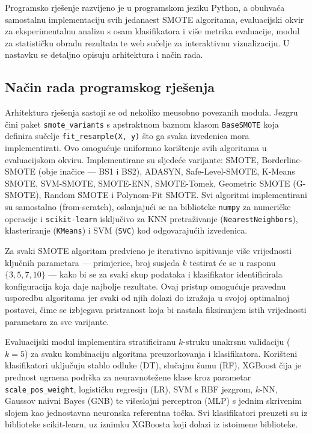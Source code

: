 
Programsko rje\v{s}enje razvijeno je u programskom jeziku Python, a
obuhva\'{c}a samostalnu implementaciju svih jedanaest SMOTE algoritama,
evaluacijski okvir za eksperimentalnu analizu s osam klasifikatora i
vi\v{s}e metrika evaluacije, modul za statisti\v{c}ku obradu rezultata
te web su\v{c}elje za interaktivnu vizualizaciju. U nastavku se
detaljno opisuju arhitektura i na\v{c}in rada.

\subsection{Na\v{c}in rada programskog rje\v{s}enja}

Arhitektura rje\v{s}enja sastoji se od nekoliko me\dj{}usobno povezanih
modula. Jezgru \v{c}ini paket \texttt{smote\_variants} s apstraktnom
baznom klasom \texttt{BaseSMOTE} koja definira su\v{c}elje
\texttt{fit\_resample(X, y)} \v{s}to ga svaka izvedenica mora
implementirati. Ovo omogu\'{c}uje uniformno kori\v{s}tenje svih
algoritama u evaluacijskom okviru. Implementirane su sljede\'{c}e
varijante: SMOTE, Borderline-SMOTE (obje ina\v{c}ice --- BS1 i BS2),
ADASYN, Safe-Level-SMOTE, K-Means SMOTE, SVM-SMOTE, SMOTE-ENN,
SMOTE-Tomek, Geometric SMOTE (G-SMOTE), Random SMOTE i Polynom-Fit SMOTE.
Svi algoritmi implementirani su samostalno (from-scratch), oslanjaju\'{c}i
se na biblioteke \texttt{numpy} za numeri\v{c}ke operacije i
\texttt{scikit-learn} \cite{pedregosa2011} isklju\v{c}ivo za KNN
pretra\v{z}ivanje (\texttt{NearestNeighbors}), klasteriranje
(\texttt{KMeans}) i SVM (\texttt{SVC}) kod odgovaraju\'{c}ih izvedenica.

Za svaki SMOTE algoritam predvi\dj{}eno je iterativno ispitivanje vi\v{s}e
vrijednosti klju\v{c}nih parametara --- primjerice, broj susjeda $k$
testirat \'{c}e se u rasponu $\{3, 5, 7, 10\}$ --- kako bi se za svaki
skup podataka i klasifikator identificirala konfiguracija koja daje
najbolje rezultate. Ovaj pristup omogu\'{c}uje pravednu usporedbu
algoritama jer svaki od njih dolazi do izra\v{z}aja u svojoj optimalnoj
postavci, \v{c}ime se izbjegava pristranost koja bi nastala fiksiranjem
istih vrijednosti parametara za sve varijante.

Evaluacijski modul implementira stratificiranu $k$-struku unakrsnu
validaciju ($k = 5$) za svaku kombinaciju algoritma preuzorkovanja i
klasifikatora. Kori\v{s}teni klasifikatori uklju\v{c}uju stablo odluke
(DT), slu\v{c}ajnu \v{s}umu (RF), XGBoost \v{c}ija je prednost ugra\dj{}ena
podr\v{s}ka za neuravnote\v{z}ene klase kroz parametar
\texttt{scale\_pos\_weight}, logisti\v{c}ku regresiju (LR), SVM s RBF
jezgrom, $k$-NN, Gaussov naivni Bayes (GNB) te vi\v{s}eslojni perceptron
(MLP) s jednim skrivenim slojem kao jednostavna neuronska referentna
to\v{c}ka. Svi klasifikatori preuzeti su iz biblioteke scikit-learn, uz
iznimku XGBoosta koji dolazi iz istoimene biblioteke.


